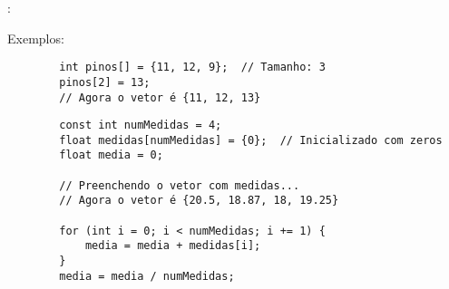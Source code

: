 \begin{frame}[fragile]{\insertsection: \insertsubsection}

	Exemplos:
	\begin{verbatim}
		int pinos[] = {11, 12, 9};  // Tamanho: 3
		pinos[2] = 13;
		// Agora o vetor é {11, 12, 13}
	\end{verbatim}

	\begin{verbatim}
		const int numMedidas = 4;
		float medidas[numMedidas] = {0};  // Inicializado com zeros
		float media = 0;

		// Preenchendo o vetor com medidas...
		// Agora o vetor é {20.5, 18.87, 18, 19.25}

		for (int i = 0; i < numMedidas; i += 1) {
			media = media + medidas[i];
		}
		media = media / numMedidas;
	\end{verbatim}

\end{frame}
